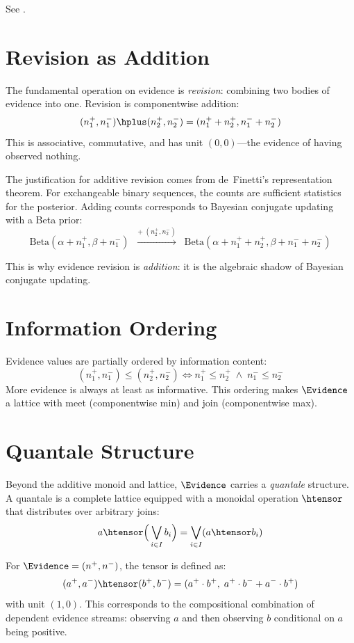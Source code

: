 \documentclass[11pt,openany]{report}
\begin{document}
See .

\section{Revision as Addition}

The fundamental operation on evidence is \emph{revision}: combining two
bodies of evidence into one.  Revision is componentwise addition:
\[
  (n_1^+, n_1^-) \hplus (n_2^+, n_2^-) = (n_1^+ + n_2^+, n_1^- + n_2^-)
\]
This is associative, commutative, and has unit $(0, 0)$---the evidence
of having observed nothing.

The justification for additive revision comes from de~Finetti's
representation theorem.  For exchangeable binary sequences, the counts
are sufficient statistics for the posterior.  Adding counts corresponds to
Bayesian conjugate updating with a Beta prior:
\[
  \text{Beta}(\alpha + n_1^+, \beta + n_1^-)
  \;\;\xrightarrow{+\;(n_2^+, n_2^-)}\;\;
  \text{Beta}(\alpha + n_1^+ + n_2^+, \beta + n_1^- + n_2^-)
\]

This is why evidence revision is \emph{addition}: it is the algebraic
shadow of Bayesian conjugate updating.

\section{Information Ordering}

Evidence values are partially ordered by information content:
\[
  (n_1^+, n_1^-) \le (n_2^+, n_2^-) \iff
  n_1^+ \le n_2^+ \;\wedge\; n_1^- \le n_2^-
\]
More evidence is always at least as informative.  This ordering makes
$\Evidence$ a lattice with meet (componentwise min) and join (componentwise
max).

\section{Quantale Structure}

Beyond the additive monoid and lattice, $\Evidence$ carries a
\emph{quantale} structure.  A quantale is a complete lattice equipped
with a monoidal operation $\htensor$ that distributes over arbitrary
joins:
\[
  a \htensor \Big(\bigvee_{i \in I} b_i\Big) = \bigvee_{i \in I} (a \htensor b_i)
\]

For $\Evidence = (n^+, n^-)$, the tensor is defined as:
\[
  (a^+, a^-) \htensor (b^+, b^-) = (a^+ \cdot b^+,\; a^+ \cdot b^- + a^- \cdot b^+)
\]
with unit $(1, 0)$.  This corresponds to the compositional combination of
dependent evidence streams: observing $a$ and then observing $b$ conditional
on $a$ being positive.
\end{document}
